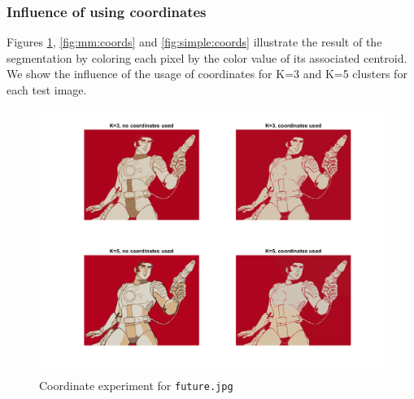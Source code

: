 \subsubsection{Influence of using coordinates}

Figures \ref{fig:future:coords}, \ref{fig:mm:coords} and \ref{fig:simple:coords} illustrate the result of the segmentation by coloring each pixel by the color value of its associated centroid. We show the influence of the usage of coordinates for K=3 and K=5 clusters for each test image.
\begin{figure}[h!]
\includegraphics[width = 0.9\linewidth]{figures/task2/future_coordinates.png}
\caption{Coordinate experiment for \texttt{future.jpg}}
\label{fig:future:coords}
\end{figure}

